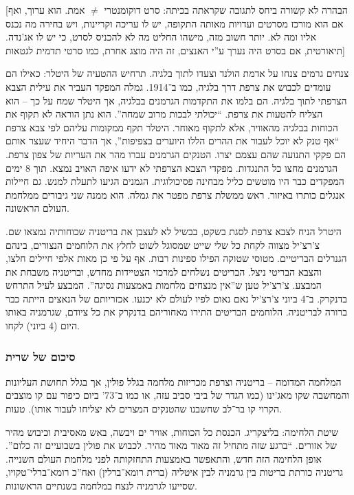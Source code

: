 \documentclass[a4paper]{book}
\begin{document}
	[הבהרה לא קשורה ביחס לתגובה שקראתה בכיתה: סרט דוקומנטרי $\neq$ אמת. הוא ערוך, ואף אם הוא מורכז מסרטים ועדויות מאותה התקופה, יש לו עריכה וקריינות, ויש בחירה מה נכנס אליו ומה לא. יותר חשוב מזה, מישהו החליט מה לא להכניס לסרט, כי יש לו אג'נדה. תיאורטית, אם בסרט היה נערך ע''י האנצים, זה היה מוצג אחרת, כמו סרטי תדמית לגטאות]
	
	צנחים גרמים צנחו על אדמת הולנד וצעדו לתוך בלגיה. תרחיש ההטעיה של היטלר: כאילו הם עומדים לכבוש את צרפת דרך בלגיה, כמו ב־1914. גמלה המפקד העביר את עילית הצבא הצרפתי לתוך בלגיה. הם בלמו את התקדמות הגרמנים בבלגיה, אך היטלר שמח על כך – הוא הצליח להטעות את צרפת. ``יכולתי לבכות מרוב שמחה''. הוא נתן הוראה לא תקוף את הכוחות בבלגיה מהאוויר, אלא לתקוף מאוחר. היטלר תקף ממקומות עליהם לפי צבא צרפת ``אף טנק לא יוכל לעבור את ההרים הללו היוערים בצפיפות'', אך הדבר היחיד שעצר אותם הם פקקי התנועה שהם עצמם יצרו. הטנקים הגרמנים עברו מהר את העריות של צפון צרפת. הגרמנים מחצו כל התנגדות. מפקדי הצבא הצרפתי לא ידעו איפה האויב נמצא. תוך 8 ימים המפקדים כבר היו מוטשים כליל מבחינה פסיכולוגית. הגמנים הגיעו לתעלת למנש. גם חיילות אנגלים כותרו באיזור. ראש ממשלת צרפת מפטר את גמלה. הוא ממנה שני גיבורים ממלחמת העולם הראשונה.
	
	היטרל הניח לצבא צרפת לסגת בשקט, בבשיל לא לעצבן את בריטניה שכוחותיה נמצאו שם. צ'רצ'יל מצווה לקחת כל שלי שייט שמסוגל לשוט לחלץ את הלוחמים הנצורים, בינהם הגנרלים הבריטיים. מטוסי שטוקה הפילו ספינות רבות. אף על פי כן מאות אלפי חיילים חלצו, והצבא הבריטי ניצל. הבריטים נשלחים למרכזי הצטיידות מחדש, ובריטניה משבחת את המבצע. צ'רצ'יל טען ש''אין מנצחים מלחמות באמצעות נסיגה''. המבצע לעיל התרחש בדנקרק. ב־4 ביוני צ'רצ'יל נאם נאום לפיו לעולם לא יכנעו. אכזריותם של הנאצים הייתה כבר ברורה לבריטניה. הלוחמים הבריטים התירו מאחוריהם בדנקרק את כל ציודם, שגרמניה באותו היום (4 ביוני) לקחו. 
	
	\subsubsection{סיכום של שרית}
	המלחמה המדומה – בריטניה וצרפת מכריזות מלחמה בגלל פולין, אך בגלל תחושת העליונות והמחשבה שקו מאג'ינו (כמו הגדר של ביבי סביב עזה, או כמו ב־73' ביום כיפור עם קו מוצבים הקרוי קו בר־לב שחשבנו שהטנקים המצרים לא יצליחו לעבור אותו). טעות. 
	
	שיטת הלחימה: בליצקריג. הכנסת כל הכוחות, אוויר ים ויבשה, באש מאסיבית וכיבוש מהיר של אזורים. ``ברגע שזה מתחיל זה מאוד מאוד מהיר. לכבוש את פולין בשבועיים זה כלום''. אופן הלחימה הזה חדש, והתאפשר באמצעות התחזקותה לפני מלחמת העולם השנייה. גריטניה כורתת בריטות בין גרמניה לבין איטליה (ברית רומא־ברלין) ואח''כ רומא־ברלי־טקויו, שסייעו לגרמניה לנצח במלחמה בשנתיים הראשונות. 
	
\end{document}

